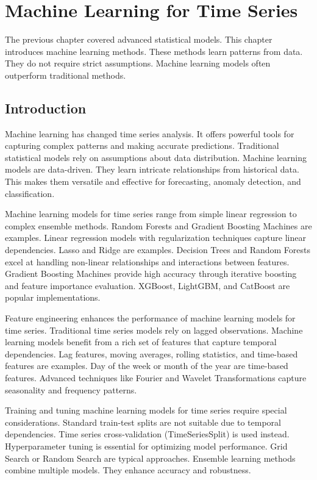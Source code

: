 \chapter{Machine Learning for Time Series}

The previous chapter covered advanced statistical models. This chapter introduces machine learning methods. These methods learn patterns from data. They do not require strict assumptions. Machine learning models often outperform traditional methods.

\section{Introduction}

Machine learning has changed time series analysis. It offers powerful tools for capturing complex patterns and making accurate predictions. Traditional statistical models rely on assumptions about data distribution. Machine learning models are data-driven. They learn intricate relationships from historical data. This makes them versatile and effective for forecasting, anomaly detection, and classification.

Machine learning models for time series range from simple linear regression to complex ensemble methods. Random Forests and Gradient Boosting Machines are examples. Linear regression models with regularization techniques capture linear dependencies. Lasso and Ridge are examples. Decision Trees and Random Forests excel at handling non-linear relationships and interactions between features. Gradient Boosting Machines provide high accuracy through iterative boosting and feature importance evaluation. XGBoost, LightGBM, and CatBoost are popular implementations.

Feature engineering enhances the performance of machine learning models for time series. Traditional time series models rely on lagged observations. Machine learning models benefit from a rich set of features that capture temporal dependencies. Lag features, moving averages, rolling statistics, and time-based features are examples. Day of the week or month of the year are time-based features. Advanced techniques like Fourier and Wavelet Transformations capture seasonality and frequency patterns.

Training and tuning machine learning models for time series require special considerations. Standard train-test splits are not suitable due to temporal dependencies. Time series cross-validation (TimeSeriesSplit) is used instead. Hyperparameter tuning is essential for optimizing model performance. Grid Search or Random Search are typical approaches. Ensemble learning methods combine multiple models. They enhance accuracy and robustness.

